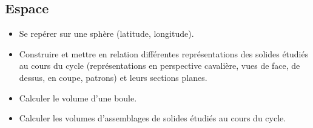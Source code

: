 \documentclass[a4paper,12pt,fleqn]{article}
\begin{document}
\subsection*{Espace}

\begin{itemize}
	\item {}Se repérer sur une sphère (latitude, longitude).
	\item {}Construire et mettre en relation différentes représentations des solides étudiés au cours du cycle (représentations en perspective cavalière, vues de face, de dessus, en coupe, patrons) et leurs sections planes.
	\item {}Calculer le volume d’une boule.
	\item {}Calculer les volumes d’assemblages de solides étudiés au cours du cycle.
\end{itemize}
	
\end{document}
